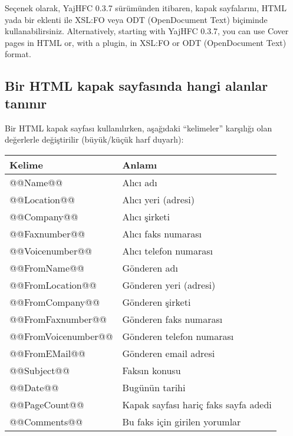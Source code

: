 \documentclass[a4paper,10pt]{scrartcl}
\begin{document}
Seçenek olarak, YajHFC 0.3.7 sürümünden itibaren, kapak sayfalarını, HTML yada bir eklenti ile XSL:FO veya ODT (OpenDocument Text) biçiminde kullanabilirsiniz.
Alternatively, starting with YajHFC 0.3.7, you can use Cover pages in HTML or, with a plugin, in XSL:FO or ODT (OpenDocument Text) format.

 \subsection{Bir HTML kapak sayfasında hangi alanlar tanınır}
Bir HTML kapak sayfası kullanılırken, aşağıdaki ``kelimeler'' karşılığı olan değerlerle değiştirilir (büyük/küçük harf duyarlı):

\begin{center}
\begin{tabular}{|l|l|}
\hline
\bfseries Kelime & \bfseries Anlamı \\
\hline\hline
\ttfamily @@Name@@ & Alıcı adı \\\hline
\ttfamily @@Location@@ & Alıcı yeri (adresi) \\\hline
\ttfamily @@Company@@ & Alıcı şirketi \\\hline
\ttfamily @@Faxnumber@@ & Alıcı faks numarası \\\hline
\ttfamily @@Voicenumber@@ & Alıcı telefon numarası \\\hline
\ttfamily @@FromName@@ & Gönderen adı \\\hline
\ttfamily @@FromLocation@@ & Gönderen yeri (adresi) \\\hline
\ttfamily @@FromCompany@@ & Gönderen şirketi \\\hline
\ttfamily @@FromFaxnumber@@ & Gönderen faks numarası \\\hline
\ttfamily @@FromVoicenumber@@ & Gönderen telefon numarası \\\hline
\ttfamily @@FromEMail@@ & Gönderen email adresi \\\hline
\ttfamily @@Subject@@ & Faksın konusu \\\hline
\ttfamily @@Date@@ & Bugünün tarihi \\\hline
\ttfamily @@PageCount@@ & Kapak sayfası hariç faks sayfa adedi \\\hline
\ttfamily @@Comments@@ & Bu faks için girilen yorumlar \\\hline
\end{tabular}
\end{center}
\end{document}
